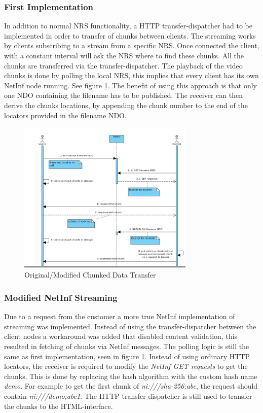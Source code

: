 \subsubsection{First Implementation}
In addition to normal NRS functionality, a HTTP transfer-dispatcher had to be implemented in order to transfer of chunks between clients. The streaming works by clients subscribing to a stream from a specific NRS. Once connected the client, with a constant interval will ask the NRS where to find these chunks. All the chunks are transferred via the transfer-dispatcher.
The playback of the video chunks is done by polling the local NRS, this implies that every client has its own NetInf node running. See figure \ref{fig:stream-seqorgmod}. The benefit of using this approach is that only one NDO containing the filename has to be published. The receiver can then derive the chunks locations, by appending the chunk number to the end of the locators provided in the filename NDO.

\begin{figure}[h!]
	\centering
		\includegraphics[width=0.75\textwidth]{./img/sequence_diagram_streaming_orgmod.png}
    	\caption{Original/Modified Chunked Data Transfer}
	\label{fig:stream-seqorgmod}
\end{figure}

\subsubsection{Modified NetInf Streaming}
Due to a request from the customer a more true NetInf implementation of streaming was implemented. Instead of using the transfer-dispatcher between the client nodes a workaround was added that disabled content validation, this resulted in fetching of chunks via NetInf messages. The polling logic is still the same as first implementation, seen in figure \ref{fig:stream-seqorgmod}. Instead of using ordinary HTTP locators, the receiver is required to modify the \textit{NetInf GET requests} to get the chunks. This is done by replacing the hash algorithm with the custom hash name \textit{demo}. For example to get the first chunk of \textit{ni:///sha-256;abc}, the request should contain \textit{ni:///demo;abc1}. The HTTP transfer-dispatcher is still used to transfer the chunks to the HTML-interface.

